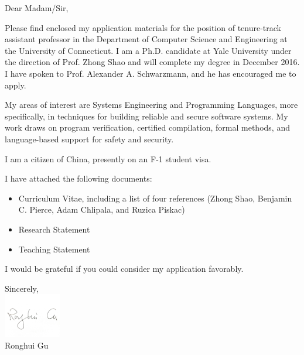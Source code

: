 \documentclass{letter}
\date{December 1, 2016}
\makeatletter
\newcommand{\subject}[1]{\def\@subject{{\centering{#1}}}}
\makeatother
\begin{document}
\begin{letter}{}

\subject{\begin{center} Re: Application for the position of tenure-track assistant professor\end{center}}


\opening{Dear Madam/Sir,}
Please find enclosed my application materials for the position of
tenure-track assistant professor in the Department of Computer Science and Engineering at the University of Connecticut. 
I am a Ph.D. candidate at Yale University under
the direction of Prof. Zhong Shao and will complete my degree in December 2016.  I
have spoken to Prof. Alexander A. Schwarzmann, and he has encouraged me to
apply. 


My areas of interest are Systems Engineering and Programming Languages,
more specifically, in techniques for building reliable and secure software systems. My work draws on program verification,
certified compilation, formal methods, and language-based support for safety and security.

I am a citizen of China, presently on an F-1 student visa.

I have attached the following documents:
\begin{itemize}
\item  Curriculum Vitae, including a list of four references (Zhong Shao, Benjamin C. Pierce, Adam Chlipala, and Ruzica Piskac)
\item Research Statement
\item Teaching Statement 
\end{itemize}

I would be grateful if you could consider my application favorably.




\closing{Sincerely,\\
\vspace{3pt}
\includegraphics[width=2.5cm]{signature.pdf}\\
Ronghui Gu
}

\end{letter}
\end{document}
